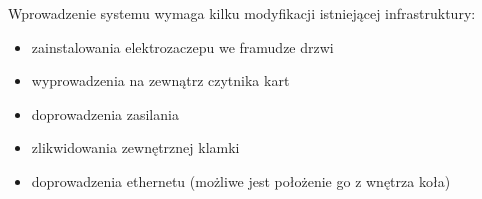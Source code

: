 \documentclass[paper=a4, fontsize=11pt]{scrartcl} %
\numberwithin{equation}{section} %
\numberwithin{figure}{section} %
\numberwithin{table}{section} %
\begin{document}
Wprowadzenie systemu wymaga kilku modyfikacji istniejącej infrastruktury:
\begin{itemize}
 \item zainstalowania elektrozaczepu we framudze drzwi
 \item wyprowadzenia na zewnątrz czytnika kart
 \item doprowadzenia zasilania
 \item zlikwidowania zewnętrznej klamki
 \item doprowadzenia ethernetu (możliwe jest położenie go z wnętrza koła)
\end{itemize}
\end{document}
